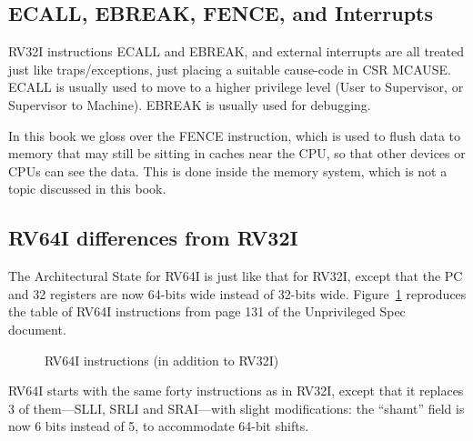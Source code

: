 \subsection{ECALL, EBREAK, FENCE, and Interrupts}

RV32I instructions ECALL and EBREAK, and external interrupts are all
treated just like traps/exceptions, just placing a suitable cause-code
in CSR MCAUSE.  ECALL is usually used to move to a higher privilege
level (User to Supervisor, or Supervisor to Machine).  EBREAK is
usually used for debugging.

In this book we gloss over the FENCE instruction, which is used to
flush data to memory that may still be sitting in caches near the CPU,
so that other devices or CPUs can see the data.  This is done inside
the memory system, which is not a topic discussed in this book.


\subsection{RV64I differences from RV32I}

The Architectural State for RV64I is just like that for RV32I, except
that the PC and 32 registers are now 64-bits wide instead of 32-bits
wide.  Figure~\ref{Fig_RV64I} reproduces the table of RV64I
instructions from page 131 of the Unprivileged Spec document.
\begin{figure}[htbp]
  \centerline{}
  \caption{\label{Fig_RV64I} RV64I instructions (in addition to RV32I)}
\end{figure}
RV64I starts with the same forty instructions as in RV32I, except that
it replaces 3 of them---SLLI, SRLI and SRAI---with slight
modifications: the ``shamt'' field is now 6 bits instead of 5, to
accommodate 64-bit shifts.

